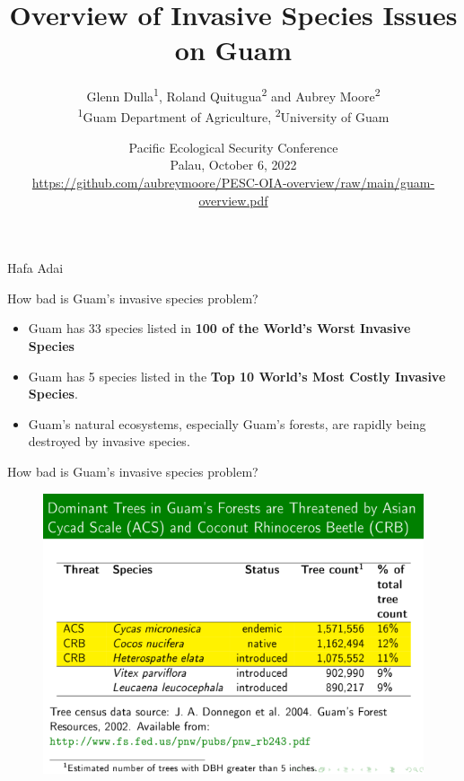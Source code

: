 \documentclass[]{beamer}
\title[Invasive Species Issues on Guam]{Overview of Invasive Species Issues on Guam}
\author[]{
	Glenn Dulla\textsuperscript{1}, Roland Quitugua\textsuperscript{2} and Aubrey Moore\textsuperscript{2}\\
	\bigskip 
	\tiny{\textsuperscript{1}Guam Department of Agriculture,
    \textsuperscript{2}University of Guam}
}
\date[]{Pacific Ecological Security Conference\\Palau, October 6, 2022\\ \tiny\url{https://github.com/aubreymoore/PESC-OIA-overview/raw/main/guam-overview.pdf}}
\begin{document}
	
    \maketitle

\begin{frame}{Hafa Adai}
\end{frame}

\begin{frame}{How bad is Guam's invasive species problem?}
	\begin{itemize}
		\item Guam has 33 species listed in \textbf{100 of the World's Worst Invasive Species}
		\item Guam has 5 species listed in the \textbf{Top 10 World's Most Costly Invasive Species}.
		\item Guam's natural ecosystems, especially Guam's forests, are rapidly being destroyed by invasive species.
	\end{itemize}	
\end{frame}

\begin{frame}{How bad is Guam's invasive species problem?}
\begin{figure}
	\centering
	\includegraphics[width=1\linewidth]{images/dominant_trees}
	\caption{}
	\label{fig:dominanttrees}
\end{figure}
\end{frame}
\end{document}
